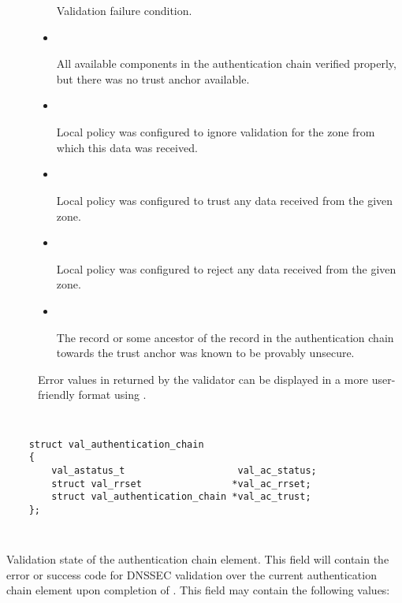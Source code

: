 \begin{description}
\begin{description}
\begin{itemize}
Validation failure condition.

\item {}\verb" "

All available components in the authentication chain verified properly, but
there was no trust anchor available.

\item {}\verb" "

Local policy was configured to ignore validation for the zone from which this
data was received.

\item {}\verb" "

Local policy was configured to trust any data received from the given zone.

\item {}\verb" "

Local policy was configured to reject any data received from the given zone.

\item {}\verb" "

The record or some ancestor of the record in the authentication chain towards
the trust anchor was known to be provably unsecure.

\end{itemize}

Error values in  returned by the validator can be displayed
in a more user-friendly format using .

\end{description}

\item {}\verb" "

\begin{verbatim}
    struct val_authentication_chain
    {
        val_astatus_t                    val_ac_status;
        struct val_rrset                *val_ac_rrset;
        struct val_authentication_chain *val_ac_trust;
    };
\end{verbatim}

\begin{description}

\item {}\verb" "

Validation state of the authentication chain element.  This field will contain
the error or success code for DNSSEC validation over the current authentication
chain element upon completion of .  This field
may contain the following values:


\end{description}
\end{description}
